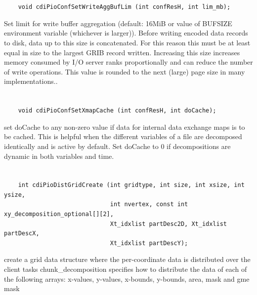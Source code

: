 \section*{\tt {}}

\begin{verbatim}
    void cdiPioConfSetWriteAggBufLim (int confResH, int lim_mb);
\end{verbatim}

Set limit for write buffer aggregation
(default: 16MiB or value of BUFSIZE environment variable (whichever
is larger)). Before writing encoded data records to disk, data
up to this size is concatenated. For this reason this must be at
least equal in size to the largest GRIB record written.  Increasing
this size increases memory consumed by I/O server ranks
proportionally and can reduce the number of write operations. This
value is rounded to the next (large) page size in many implementations..


\section*{\tt {}}

\begin{verbatim}
    void cdiPioConfSetXmapCache (int confResH, int doCache);
\end{verbatim}

set doCache to any non-zero value if data
for internal data exchange maps is to be cached. This is helpful
when the different variables of a file are decomposed identically
and is active by default. Set doCache to 0 if decompositions are
dynamic in both variables and time.


\section*{\tt {}}

\begin{verbatim}
    int cdiPioDistGridCreate (int gridtype, int size, int xsize, int ysize,
                              int nvertex, const int xy_decomposition_optional[][2],
                              Xt_idxlist partDesc2D, Xt_idxlist partDescX,
                              Xt_idxlist partDescY);
\end{verbatim}

create a grid data structure where the
per-coordinate data is distributed over the client tasks
chunk_decomposition specifies how to distribute the data of each of
the following arrays:
x-values, y-values, x-bounds, y-bounds, area, mask and gme mask


